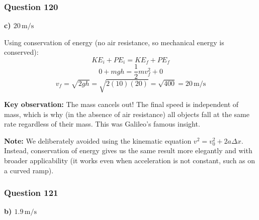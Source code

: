 \documentclass[12pt,letterpaper]{article}
\begin{document}
\subsubsection*{Question 120}

\begin{answerbox}
\textbf{c) $20\,\text{m/s}$}
\end{answerbox}

\begin{explanationbox}
Using conservation of energy (no air resistance, so mechanical energy is conserved):
\[
KE_i + PE_i = KE_f + PE_f
\]
\[
0 + mgh = \frac{1}{2}mv_f^2 + 0
\]
\[
v_f = \sqrt{2gh} = \sqrt{2(10)(20)} = \sqrt{400} = 20\,\text{m/s}
\]

\textbf{Key observation:} The mass cancels out! The final speed is independent of mass, which is why (in the absence of air resistance) all objects fall at the same rate regardless of their mass. This was Galileo's famous insight.

\textbf{Note:} We deliberately avoided using the kinematic equation $v^2 = v_0^2 + 2a\Delta x$. Instead, conservation of energy gives us the same result more elegantly and with broader applicability (it works even when acceleration is not constant, such as on a curved ramp).
\end{explanationbox}

\subsubsection*{Question 121}

\begin{answerbox}
\textbf{b) $1.9\,\text{m/s}$}
\end{answerbox}
\end{document}
